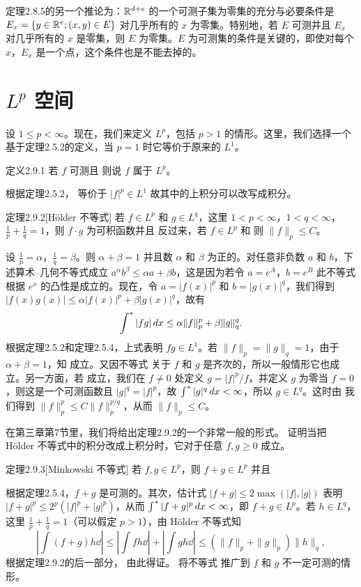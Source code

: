 定理2.8.5的另一个推论为：$\mathbb R^{d+e}$ 的一个可测子集为零集的充分与必要条件是 $E_x=\{y\in\mathbb R^e;(x,y)\in E\}$ 对几乎所有的 $x$ 为零集。特别地，若 $E$ 可测并且 $E_x$ 对几乎所有的 $x$ 是零集，则 $E$ 为零集。$E$ 为可测集的条件是关键的，即使对每个 $x$，$E_x$ 是一个点，这个条件也是不能去掉的。
\section{\texorpdfstring{$L^p$}{Lp} 空间}
设 $1\le p<\infty$。现在，我们来定义 $L^p$，包括 $p>1$ 的情形。这里，我们选择一个基于定理2.5.2的定义，当 $p=1$ 时它等价于原来的 $L^1$。
\begin{statement}{定义}{2.9.1}
若 $f$ 可测且
则说 $f$ 属于 $L^p$。
\end{statement}
根据定理2.5.2， 等价于 $|f|^p\in L^1$ 故其中的上积分可以改写成积分。
\begin{statement}{定理}{2.9.2}[Hölder 不等式]
若 $f\in L^p$ 和 $g\in L^q$，这里 $1<p<\infty$，$1<q<\infty$，$\frac1p+\frac1q=1$，则 $f\cdot g$ 为可积函数并且
反过来，若 $f\in L^p$ 和
则 $\|f\|_p\le C$。
\end{statement}
\Proof 设 $\frac1p=\alpha$，$\frac1q=\beta$。则 $\alpha+\beta=1$ 并且数 $\alpha$ 和 $\beta$ 为正的。对任意非负数 $a$ 和 $b$，下述算术--几何不等式成立 $a^\alpha b^\beta\le\alpha a+\beta b$，这是因为若令 $a=e^A$，$b=e^B$ 此不等式根据 $e^x$ 的凸性是成立的。现在，令 $a=|f(x)|^p$ 和 $b=|g(x)|^q$，我们得到 $|f(x)g(x)|\le\alpha|f(x)|^p+\beta|g(x)|^q$，故有
\[\int^{*}|fg|\,dx\le\alpha\|f\|_p^p+\beta\|g\|_q^q.\]
根据定理2.5.2和定理2.5.4，上式表明 $fg\in L^1$。若 $\|f\|_p=\|g\|_q=1$，由于 $\alpha+\beta=1$，知  成立。又因不等式  关于 $f$ 和 $g$ 是齐次的，所以一般情形它也成立。另一方面，若  成立，我们在 $f\ne0$ 处定义 $g=|f|^p/f$，并定义 $g$ 为零当 $f=0$，则这是一个可测函数且 $|g|^q=|f|^p$，故 $\int^{*}|g|^q\,dx<\infty$，所以 $g\in L^q$。这时由  我们得到 $\|f\|_p^p\le C\|f\|_p^{p/q}$，从而 $\|f\|_p\le C$。

在第三章第7节里，我们将给出定理2.9.2的一个非常一般的形式。
\Exercise 证明当把 Hölder 不等式中的积分改成上积分时，它对于任意 $f,g\ge0$ 成立。
\begin{statement}{定理}{2.9.3}[Minkowski 不等式]
若 $f,g\in L^p$，则 $f+g\in L^p$ 并且
\end{statement}
\Proof 根据定理2.5.4，$f+g$ 是可测的。其次，估计式 $|f+g|\le2\max(|f|,|g|)$ 表明 $|f+g|^p\le2^p(|f|^p+|g|^p)$，从而 $\int^{*}|f+g|^p\,dx<\infty$，即 $f+g\in L^p$。若 $h\in L^q$，这里 $\frac1p+\frac1q=1$（可以假定 $p>1$），由
Hölder 不等式知
\[\left|\int(f+g)h\dd\right|\le\left|\int fh\dd\right|+\left|\int gh\dd\right|\le(\|f\|_p+\|g\|_p)\|h\|_q,\]
根据定理2.9.2的后一部分， 由此得证。
\Exercise 将不等式  推广到 $f$ 和 $g$ 不一定可测的情形。

